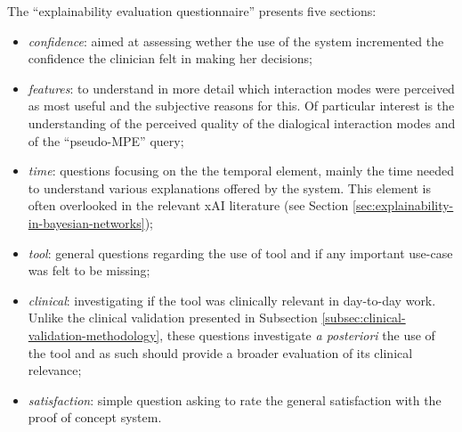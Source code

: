 The \enquote{explainability evaluation questionnaire} presents five sections:
\begin{itemize}
  \item \textit{confidence}: aimed at assessing wether the use of the system incremented the confidence the clinician felt in making her decisions;
  \item \textit{features}: to understand in more detail which interaction modes were perceived as most useful and the subjective reasons for this.
  Of particular interest is the understanding of the perceived quality of the dialogical interaction modes and of the \enquote{pseudo-MPE} query;
  \item \textit{time}: questions focusing on the the temporal element, mainly the time needed to understand various explanations offered by the system.
  This element is often overlooked in the relevant xAI literature (see Section \ref{sec:explainability-in-bayesian-networks});
  \item \textit{tool}: general questions regarding the use of tool and if any important use-case was felt to be missing;
  \item \textit{clinical}: investigating if the tool was clinically relevant in day-to-day work.
  Unlike the clinical validation presented in Subsection \ref{subsec:clinical-validation-methodology}, these questions investigate \textit{a posteriori} the use of the tool and as such should provide a broader evaluation of its clinical relevance;
  \item \textit{satisfaction}: simple question asking to rate the general satisfaction with the proof of concept system.
\end{itemize}

